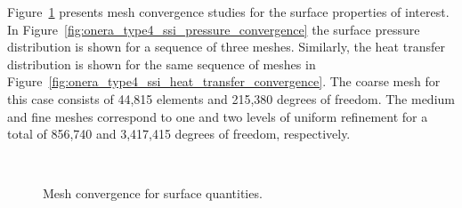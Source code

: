 Figure~\ref{fig:onera_type4_ssi_mesh_convergence} presents mesh convergence studies for the surface properties of interest.  In Figure~\ref{fig:onera_type4_ssi_pressure_convergence} the surface pressure distribution is shown for a sequence of three meshes.  Similarly, the heat transfer distribution is shown for the same sequence of meshes in Figure~\ref{fig:onera_type4_ssi_heat_transfer_convergence}.  The coarse mesh for this case consists of 44,815 elements and 215,380 degrees of freedom.  The medium and fine meshes correspond to one and two levels of uniform refinement for a total of 856,740 and 3,417,415 degrees of freedom, respectively.
\begin{figure}[hbtp]
  \begin{center}
     \\
    \caption{Mesh convergence for surface quantities.\label{fig:onera_type4_ssi_mesh_convergence}}
  \end{center}
\end{figure}
